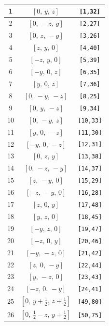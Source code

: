 \documentclass[fleqn,8pt]{jsarticle}
\begin{document}
\begin{longtable}{ccc}
1 & $\left[ 0,\, y,\, z \right]$ & {\tt [1,32]} \\ \hline
2 & $\left[ 0,\, - z,\, y \right]$ & {\tt [2,27]} \\ \hline
3 & $\left[ 0,\, z,\, - y \right]$ & {\tt [3,26]} \\ \hline
4 & $\left[ z,\, y,\, 0 \right]$ & {\tt [4,40]} \\ \hline
5 & $\left[ - z,\, y,\, 0 \right]$ & {\tt [5,39]} \\ \hline
6 & $\left[ - y,\, 0,\, z \right]$ & {\tt [6,35]} \\ \hline
7 & $\left[ y,\, 0,\, z \right]$ & {\tt [7,36]} \\ \hline
8 & $\left[ 0,\, - y,\, - z \right]$ & {\tt [8,25]} \\ \hline
9 & $\left[ 0,\, y,\, - z \right]$ & {\tt [9,34]} \\ \hline
10 & $\left[ 0,\, - y,\, z \right]$ & {\tt [10,33]} \\ \hline
11 & $\left[ y,\, 0,\, - z \right]$ & {\tt [11,30]} \\ \hline
12 & $\left[ - y,\, 0,\, - z \right]$ & {\tt [12,31]} \\ \hline
13 & $\left[ 0,\, z,\, y \right]$ & {\tt [13,38]} \\ \hline
14 & $\left[ 0,\, - z,\, - y \right]$ & {\tt [14,37]} \\ \hline
15 & $\left[ z,\, - y,\, 0 \right]$ & {\tt [15,29]} \\ \hline
16 & $\left[ - z,\, - y,\, 0 \right]$ & {\tt [16,28]} \\ \hline
17 & $\left[ z,\, 0,\, y \right]$ & {\tt [17,48]} \\ \hline
18 & $\left[ y,\, z,\, 0 \right]$ & {\tt [18,45]} \\ \hline
19 & $\left[ - y,\, z,\, 0 \right]$ & {\tt [19,47]} \\ \hline
20 & $\left[ - z,\, 0,\, y \right]$ & {\tt [20,46]} \\ \hline
21 & $\left[ - y,\, - z,\, 0 \right]$ & {\tt [21,42]} \\ \hline
22 & $\left[ z,\, 0,\, - y \right]$ & {\tt [22,44]} \\ \hline
23 & $\left[ y,\, - z,\, 0 \right]$ & {\tt [23,43]} \\ \hline
24 & $\left[ - z,\, 0,\, - y \right]$ & {\tt [24,41]} \\ \hline
25 & $\left[ 0,\, y + \frac{1}{2},\, z + \frac{1}{2} \right]$ & {\tt [49,80]} \\ \hline
26 & $\left[ 0,\, \frac{1}{2} - z,\, y + \frac{1}{2} \right]$ & {\tt [50,75]} \\ \hline

\end{longtable}
\end{document}
